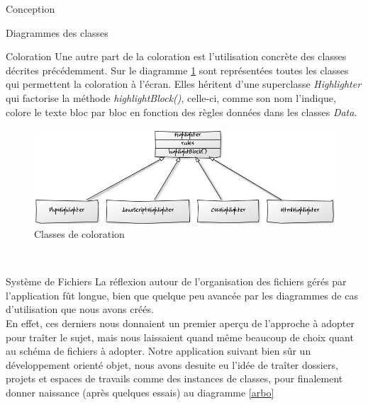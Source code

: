 \documentclass[a4paper, 12pt]{report}
\begin{document}
\begin{part}{Conception}
\begin{chapter}{Diagrammes des classes}
\begin{section}{Coloration}
				Une autre part de la coloration est l'utilisation concrète des classes décrites précédemment. Sur le diagramme \ref{bicyclette} sont
				représentées toutes les classes qui permettent la coloration à l'écran. Elles héritent d'une superclasse
				\emph{Highlighter} qui factorise la méthode \emph{highlightBlock()}, celle-ci, comme son nom l'indique, colore le texte bloc
				par bloc en fonction des règles données dans les classes \emph{Data}.
				\begin{figure}[ht]
					\begin{center}
						\includegraphics[width=14cm]{images/classesColoration.jpg}
						\caption{Classes de coloration}
						\label{bicyclette}
					\end{center}
				\end{figure}~\\
			\end{section}
			\begin{section}{Système de Fichiers}
				La réflexion autour de l'organisation des fichiers gérés par l'application fût longue, bien que quelque peu avancée par les
				diagrammes de cas d'utilisation que nous avons créés.\\
				En effet, ces derniers nous donnaient un premier aperçu de l'approche à adopter pour traîter le sujet, mais nous laissaient quand
				même beaucoup de choix quant au schéma de fichiers à adopter. Notre application suivant bien sûr un développement orienté objet, 
				nous avons desuite eu l'idée de traîter dossiers, projets et espaces de travails comme des instances de classes, pour finalement 
				donner naissance (après quelques essais) au diagramme \ref{arbo} \\
				\begin{figure}[ht]
					\begin{center}

\end{center}
\end{figure}
\end{section}
\end{chapter}
\end{part}
\end{document}
